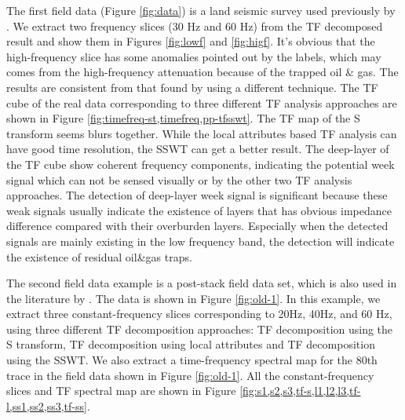 The first field data (Figure \ref{fig:data}) is a land seismic survey used previously by \cite[]{fomel20132}. We extract two frequency slices (30 Hz and 60 Hz) from the TF decomposed result and show them in Figures \ref{fig:lowf} and \ref{fig:higf}. It's obvious that the high-frequency slice has some anomalies pointed out by the labels, which may comes from the high-frequency attenuation because of the trapped oil \& gas. The results are consistent from that found by \cite{fomel20132} using a different technique. The TF cube of the real data corresponding to three different TF analysis approaches are shown in Figure \ref{fig:timefreq-st,timefreq,pp-tfsswt}. The TF map of the S transform seems blurs together. While the local attributes based TF analysis can have good time resolution, the SSWT can get a better result.
The deep-layer of the TF cube show coherent frequency components, indicating the %
potential week signal which can not be sensed visually or by the other two TF analysis approaches. The detection of deep-layer week signal is significant because these weak signals usually indicate the existence of layers that has obvious impedance difference compared with their overburden layers. Especially when the detected signals are mainly existing in the low frequency band, the detection will indicate the existence of residual oil\&gas traps.




The second field data example is a post-stack field data set, which is also used in the literature by \cite{guochang20112}. The data is shown in Figure \ref{fig:old-1}. In this example, we extract three constant-frequency slices corresponding to 20Hz, 40Hz, and 60 Hz, using three different TF decomposition approaches: TF decomposition using the S transform, TF decomposition using local attributes and TF decomposition using the SSWT. We also extract a time-frequency spectral map for the 80th trace in the field data shown in Figure \ref{fig:old-1}. All the constant-frequency slices and TF spectral map are shown in Figure \ref{fig:s1,s2,s3,tf-s,l1,l2,l3,tf-l,ss1,ss2,ss3,tf-ss}.

